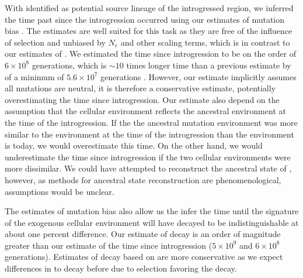 \documentclass[12pt]{article}
\begin{document}
With \gossypii identified as potential source lineage of the introgressed region, we inferred the time past since the introgression occurred using our estimates of mutation bias \DM.
The \DM estimates are well suited for this task as they are free of the influence of selection and unbiased by $N_e$ and other scaling terms, which is in contrast to our estimates of \DE \citep{gilchrist2015}.
We estimated the time since introgression to be on the order of $6\times 10^8$ generations, which is $\sim 10$ times longer time than a previous estimate by \citet{friedrich2015} of a minimum of $5.6\times 10^7$ generations .
However, our estimate implicitly assumes all mutations are neutral, it is therefore a conservative estimate, potentially overestimating the time since introgression. 
Our estimate also depend on the assumption that the \gossypii cellular environment reflects the ancestral environment at the time of the introgression.
If the the ancestral mutation environment was more similar to the \kluyveri environment at the time of the introgression than the \gossypii environment is today, we would overestimate this time.
On the other hand, we would underestimate the time since introgression if the two cellular environments were more dissimilar.
We could have attempted to reconstruct the ancestral state of \gossypii, however, as methods for ancestral state reconstruction are phenomenological, assumptions would be unclear. 

The estimates of mutation bias \DM also allow us the infer the time until the signature of the exogenous cellular environment will have decayed to be indistinguishable at about one percent difference.
Our estimate of decay is an order of magnitude greater than our estimate of the time since introgression ($5\times 10^9$ and $6\times 10^8$ generations).
Estimates of decay based on \DM are more conservative as we expect differences in \DE to decay before due to selection favoring the decay.
 
\end{document}
